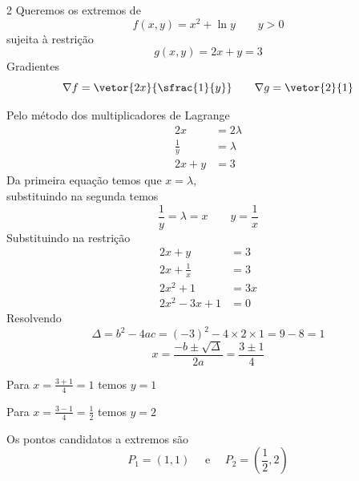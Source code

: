 \documentclass[a4paper,12pt,fleqn]{article}
\begin{document}
\begin{answer}
\begin{multicols}{2}
Queremos os extremos de
\[
    f(x, y) = x^2+\ln y \qquad y > 0
\]
sujeita à restrição
\[
    g(x, y) = 2x + y = 3
\]
Gradientes
\[
    \nabla f = \vetor{2x}{\sfrac{1}{y}}
    \qquad
    \nabla g = \vetor{2}{1}
\]

Pelo método dos multiplicadores de Lagrange
\begin{align*}
    2x          & = 2\lambda \\
    \frac{1}{y} & = \lambda \\
    2x + y      & = 3
\end{align*}
Da primeira equação temos que \(x=\lambda\), \\
substituindo na segunda temos
\[
    \frac{1}{y} = \lambda = x
    \qquad
    y = \frac{1}{x}
\]
Substituindo na restrição
\begin{align*}
    2x + y           & = 3  \\
    2x + \frac{1}{x} & = 3  \\
    2x^2 + 1         & = 3x \\
    2x^2 - 3x + 1    & = 0
\end{align*}
Resolvendo
\[
    \Delta
    = b^2 - 4ac
    = (-3)^2 - 4 \times 2 \times 1
    = 9 - 8
    = 1
\]
\[
    x
    = \frac{-b\pm\sqrt{\Delta}}{2a}
    = \frac{3\pm 1}{4}
\]

\smallskip
Para \(x=\frac{3+1}{4}=1\) temos \(y=1\)

\smallskip
Para \(x=\frac{3-1}{4}=\frac{1}{2}\) temos \(y=2\)

\smallskip
Os pontos candidatos a extremos são
\[
  P_1 = \left(1, 1\right)
  \quad \text{ e } \quad
  P_2 = \left(\frac{1}{2}, 2\right)
\]
\end{multicols}
\end{answer}

\end{document}
